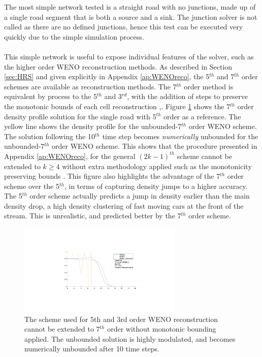 	The most simple network tested is a straight road with no junctions, made up of a single road segment that is both a source and a sink. The junction solver is not called as there are no defined junctions, hence this test can be executed very quickly due to the simple simulation process. 
	\\ \\ 
	This simple network is useful to expose individual features of the solver, such as the higher order WENO reconstruction methods. As described in Section \ref{sec:HRS} and given explicitly in Appendix \ref{ap:WENOreco}, the 5$^{th}$ and 7$^{th}$ order schemes are available as reconstruction methods. The 7$^{th}$ order method is equivalent by process to the 5$^{th}$ and 3$^{rd}$, with the addition of steps to preserve the monotonic bounds of each cell reconstruction \cite{BalsaraShu00},\cite{Suresh97}. Figure \ref{fig:randd:single:7thOrder} shows the 7$^{th}$ order density profile solution for the single road with 5$^{th}$ order as a reference. The yellow line shows the density profile for the unbounded-7$^{th}$ order WENO scheme. The solution following the 10$^{th}$ time step becomes \emph{numerically} unbounded for the unbounded-7$^{th}$ order WENO scheme. This shows that the procedure presented in Appendix \ref{ap:WENOreco}, for the general $(2k-1)^{th}$ scheme cannot be extended to $k\ge4$ without extra methodology applied such as the monotonicity preserving bounds \cite{BalsaraShu00}. This figure also highlights the advantage of the 7$^{th}$ order scheme over the 5$^{th}$, in terms of capturing density jumps to a higher accuracy. The 5$^{th}$ order scheme actually predicts a jump in density earlier than the main density drop, a high density clustering of fast moving cars at the front of the stream. This is unrealistic, and predicted better by the 7$^{th}$ order scheme.

	\begin{figure}
    		\centering
        		\includegraphics[trim=240 130 230 130,clip,width=0.7\textwidth]{SingleRoad_W7.pdf}
		\caption[Single Road : 7th order WENO]{The scheme used for 5th and 3rd order WENO reconstruction cannot be extended to 7$^{th}$ order without monotonic bounding applied. The unbounded solution is highly modulated, and becomes numerically unbounded after 10 time steps.}
		\label{fig:randd:single:7thOrder}
	\end{figure}

